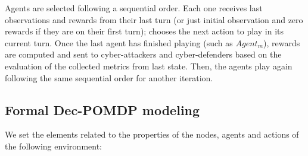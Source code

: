 \noindent
Agents are selected following a sequential order. Each one receives last observations and rewards from their last turn (or just initial observation and zero rewards if they are on their first turn); chooses the next action to play in its current turn. Once the last agent has finished playing (such as $Agent_m$), rewards are computed and sent to cyber-attackers and cyber-defenders based on the evaluation of the collected metrics from last state. Then, the agents play again following the same sequential order for another iteration.


\subsection{Formal Dec-POMDP modeling}

We set the elements related to the properties of the nodes, agents and actions of the following environment:

